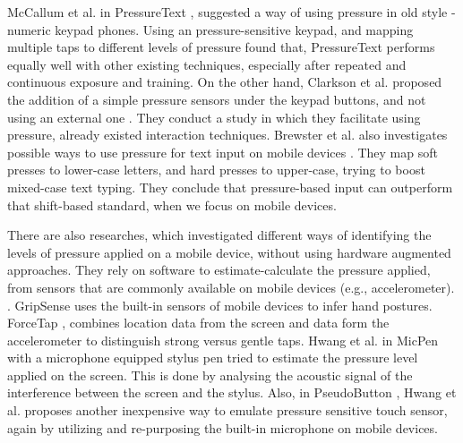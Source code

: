 McCallum et al. in PressureText \cite{McCallum:2009:PPI:1520340.1520693}, suggested a way of using pressure in old style - numeric keypad phones. Using an pressure-sensitive keypad, and mapping multiple taps to different levels of pressure found that, PressureText performs equally well with other existing techniques, especially after repeated and continuous exposure and training. On the other hand, Clarkson et al. proposed the addition of a simple pressure sensors under the keypad buttons, and not using an external one \cite{ClarksonGVU}. They conduct a study in which they facilitate using pressure, already existed interaction techniques. 
Brewster et al. also investigates possible ways to use pressure for text input on mobile devices \cite{Brewster:2009:PTE:1613858.1613870}. They map soft presses to lower-case letters, and hard presses to upper-case, trying to boost mixed-case text typing. They conclude that pressure-based input can outperform that shift-based standard, when we focus on mobile devices.

There are also researches, which investigated different ways of identifying the levels of pressure applied on a mobile device, without using hardware augmented approaches. They rely on software to estimate-calculate the pressure applied, from sensors that are commonly available on mobile devices (e.g., accelerometer). \cite{Goel:2012:GUB:2380116.2380184,Heo:2011:FEI:2037373.2037393,Hwang:2012:MPP:2212776.2223717,Hwang:2012:PEP:2212776.2223673}. GripSense \cite{Goel:2012:GUB:2380116.2380184} uses the built-in sensors of mobile devices to infer hand postures.
 ForceTap \cite{Heo:2011:FEI:2037373.2037393}, combines location data from the screen and data form the accelerometer to distinguish strong versus gentle taps. Hwang et al. in MicPen \cite{Hwang:2012:MPP:2212776.2223717} with a microphone equipped stylus pen tried to estimate the pressure level applied on the screen. This is done by analysing the acoustic signal of the interference between the screen and the stylus. Also, in PseudoButton \cite{Hwang:2012:PEP:2212776.2223673}, Hwang et al. proposes another inexpensive way to emulate pressure sensitive touch sensor, again by utilizing and re-purposing the built-in microphone on mobile devices.


